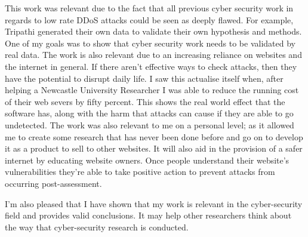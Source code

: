 This work was relevant due to the fact that all previous cyber security work in regards to low rate DDoS attacks could be seen as deeply flawed. For example, Tripathi generated their own data to validate their own hypothesis and methods. One of my goals was to show that cyber security work needs to be validated by real data. The work is also relevant due to an increasing reliance on websites and the internet in general. If there aren't effective ways to check attacks, then they have the potential to disrupt daily life. I saw this actualise itself when, after helping a Newcastle University Researcher I was able to reduce the running cost of their web severs by fifty percent. This shows the real world effect that the software has, along with the harm that attacks can cause if they are able to go undetected. The work was also relevant to me on a personal level; as it allowed me to create some research that has never been done before and go on to develop it as a product to sell to other websites. It will also aid in the provision of a safer internet by educating website owners. Once people understand their website's vulnerabilities they're able to take positive action to prevent attacks from occurring post-assessment.

I'm also pleased that I have shown that my work is relevant in the cyber-security field and provides valid conclusions. It may help other researchers think about the way that cyber-security research is conducted.